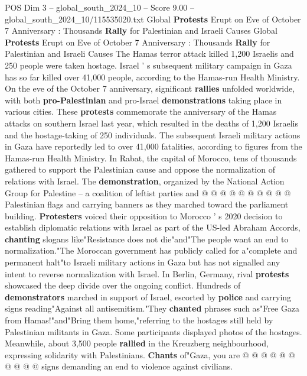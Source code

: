 \begin{textsample}{POS Dim 3 – global\_south\_2024\_10 – Score 9.00 – global\_south\_2024\_10/115535020.txt}  \label{ex:f3_pos_365}
Global \textbf{Protests} Erupt on Eve of October 7 Anniversary : Thousands \textbf{Rally} for Palestinian and Israeli Causes Global \textbf{Protests} Erupt on Eve of October 7 Anniversary : Thousands \textbf{Rally} for Palestinian and Israeli Causes The Hamas terror attack killed 1,200 Israelis and 250 people were taken hostage.
Israel ' s subsequent military campaign in Gaza has so far killed over 41,000 people, according to the Hamas-run Health Ministry.
On the eve of the October 7 anniversary, significant \textbf{rallies} unfolded worldwide, with both \textbf{pro-Palestinian} and pro-Israel \textbf{demonstrations} taking place in various cities.
These \textbf{protests} commemorate the anniversary of the Hamas attacks on southern Israel last year, which resulted in the deaths of 1,200 Israelis and the hostage-taking of 250 individuals.
The subsequent Israeli military actions in Gaza have reportedly led to over 41,000 fatalities, according to figures from the Hamas-run Health Ministry.
In Rabat, the capital of Morocco, tens of thousands gathered to support the Palestinian cause and oppose the normalization of relations with Israel.
The \textbf{demonstration}, organized by the National Action Group for Palestine -- a coalition of leftist parties and @ @ @ @ @ @ @ @ @ @ Palestinian flags and carrying banners as they marched toward the parliament building. \textbf{Protesters} voiced their opposition to Morocco ' s 2020 decision to establish diplomatic relations with Israel as part of the US-led Abraham Accords, \textbf{chanting} slogans like"Resistance does not die"and"The people want an end to normalization."The Moroccan government has publicly called for a"complete and permanent halt"to Israeli military actions in Gaza but has not signalled any intent to reverse normalization with Israel.
In Berlin, Germany, rival \textbf{protests} showcased the deep divide over the ongoing conflict.
Hundreds of \textbf{demonstrators} marched in support of Israel, escorted by \textbf{police} and carrying signs reading"Against all antisemitism."They \textbf{chanted} phrases such as"Free Gaza from Hamas!"and"Bring them home,"referring to the hostages still held by Palestinian militants in Gaza.
Some participants displayed photos of the hostages.
Meanwhile, about 3,500 people \textbf{rallied} in the Kreuzberg neighbourhood, expressing solidarity with Palestinians. \textbf{Chants} of"Gaza, you are @ @ @ @ @ @ @ @ @ @ signs demanding an end to violence against civilians.

\end{textsample}
